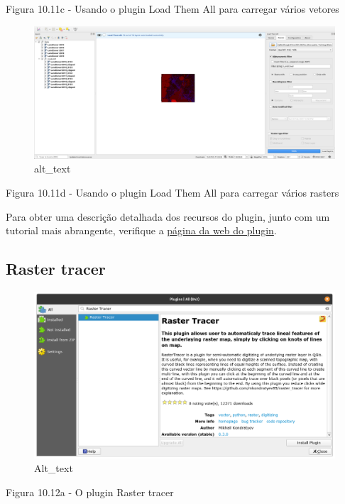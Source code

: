 \documentclass[
  portuguese,
]{krantz}
\begin{document}
Figura 10.11c - Usando o plugin Load Them All para carregar vários vetores

\begin{figure}
\centering
\includegraphics{media/modulo10/fig1011_d.png}
\caption{alt\_text}
\end{figure}

Figura 10.11d - Usando o plugin Load Them All para carregar vários rasters

Para obter uma descrição detalhada dos recursos do plugin, junto com um tutorial mais abrangente, verifique a \href{https://github.com/gacarrillor/loadthemall}{página da web do plugin}.

\hypertarget{raster-tracer}{%
\subsection{\texorpdfstring{\textbf{Raster tracer}}{Raster tracer}}\label{raster-tracer}}

\begin{figure}
\centering
\includegraphics{media/modulo10/fig1012_a.png}
\caption{Alt\_text}
\end{figure}

Figura 10.12a - O plugin Raster tracer
\end{document}
